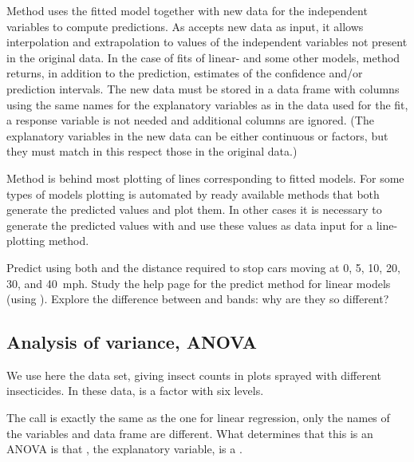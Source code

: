 \documentclass[krantz2]{krantz}\usepackage{knitr}
\begin{document}
Method  uses the fitted model together with new data for the independent variables to compute predictions. As  accepts new data as input, it allows interpolation and extrapolation to values of the independent variables not present in the original data. In the case of fits of linear- and some other models, method  returns, in addition to the prediction, estimates of the confidence and/or prediction intervals. The new data must be stored in a data frame with columns using the same names for the explanatory variables as in the data used for the fit, a response variable is not needed and additional columns are ignored. (The explanatory variables in the new data can be either continuous or factors, but they must match in this respect those in the original data.)

\begin{infobox}
  Method  is behind most plotting of lines corresponding to fitted models. For some types of models plotting is automated by ready available methods that both generate the predicted values and plot them. In other cases it is necessary to generate the predicted values with  and use these values as data input for a line-plotting method.
\end{infobox}

\begin{playground}
Predict using both  and  the distance required to stop cars moving at 0, 5, 10, 20, 30, and 40~mph. Study the help page for the predict method for linear models (using ). Explore the difference between  and  bands: why are they so different?
\end{playground}

\subsection{Analysis of variance, ANOVA}\label{sec:anova}
We use here the  data set, giving insect counts in plots sprayed with different insecticides. In these data,  is a factor with six levels.%
\label{xmpl:fun:lm:fm4}

The call is exactly the same as the one for linear regression, only the names of the variables and data frame are different. What determines that this is an ANOVA is that , the explanatory variable, is a .
\end{document}
